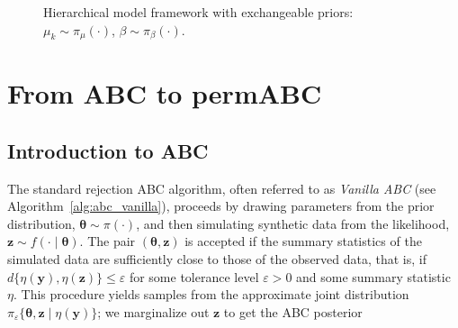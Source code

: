 \documentclass[lineno]{biometrika}
\def\obsdata{\mathbf{y}}
\def\param{\boldsymbol{\theta}}
\def\simdata{\mathbf{z}}
\begin{document}
\begin{figure}
\begin{center}
\end{center}
\caption{Hierarchical model framework with exchangeable priors: $\mu_k \sim \pi_\mu(\cdot)$, $\beta \sim \pi_\beta(\cdot)$.}
\label{fig:hier}
\end{figure}



\section{From ABC to permABC}
\label{secabc_to_permabc}
%
\subsection{Introduction to ABC}


The standard rejection ABC algorithm, often referred to as \emph{Vanilla ABC} (see Algorithm~\ref{alg:abc_vanilla}), proceeds by drawing parameters from the prior distribution, $\param \sim \pi(\cdot)$, and then simulating synthetic data from the likelihood, $\simdata \sim f(\cdot \mid \param)$. The pair $(\param, \simdata)$ is accepted if the summary statistics of the simulated data are sufficiently close to those of the observed data, that is, if $d\{\eta(\obsdata), \eta(\simdata)\} \leq \varepsilon$ for some tolerance level $\varepsilon > 0$ and some summary statistic $\eta$. This procedure yields samples from the approximate joint distribution $\pi_{\varepsilon}\{\param,\simdata \mid \eta(\obsdata)\}$; we marginalize out $\simdata$ to get the ABC posterior
\end{document}
